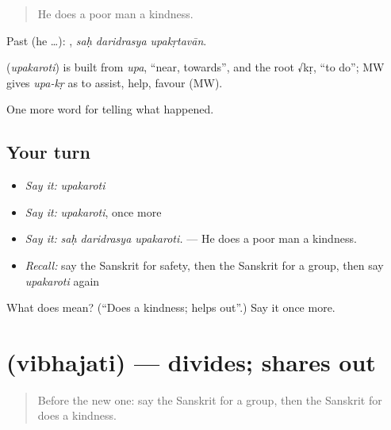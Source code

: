 \begin{quote}
He does a poor man a kindness.
\end{quote}

Past (he …):   , \emph{saḥ daridrasya upakṛtavān}.

\begin{cousinweb}
\textbf{} (\emph{upakaroti}) is built from \emph{upa}, \textquotedblleft{}near, towards\textquotedblright{}, and the root √kṛ, \textquotedblleft{}to do\textquotedblright{}; MW gives \emph{upa-kṛ} as to assist, help, favour (MW).
\end{cousinweb}

\begin{grammarlens}[title={What you've built}]
One more word for telling what happened.
\end{grammarlens}

\subsection*{Your turn}
\begin{itemize}
\raggedright
  \item \emph{Say it:} \emph{upakaroti}
  \item \emph{Say it:} \emph{upakaroti}, once more
  \item \emph{Say it:} \emph{saḥ daridrasya upakaroti.} — He does a poor man a kindness.
  \item \emph{Recall:} say the Sanskrit for safety, then the Sanskrit for a group, then say \emph{upakaroti} again
\end{itemize}

\begin{tcolorbox}[breakable,colback=teal!4,colframe=teal!35!black,title={Before you move on}]
What does  mean? (\textquotedblleft{}Does a kindness; helps out\textquotedblright{}.) Say it once more.
\end{tcolorbox}
\section[\texorpdfstring{\sk{विभजति} (vibhajati)}{विभजति (vibhajati)}]{ (vibhajati) — divides; shares out}

\label{lesson:SA-C308-vibhajati}



\begin{quote}
Before the new one: say the Sanskrit for a group, then the Sanskrit for does a kindness.
\end{quote}

